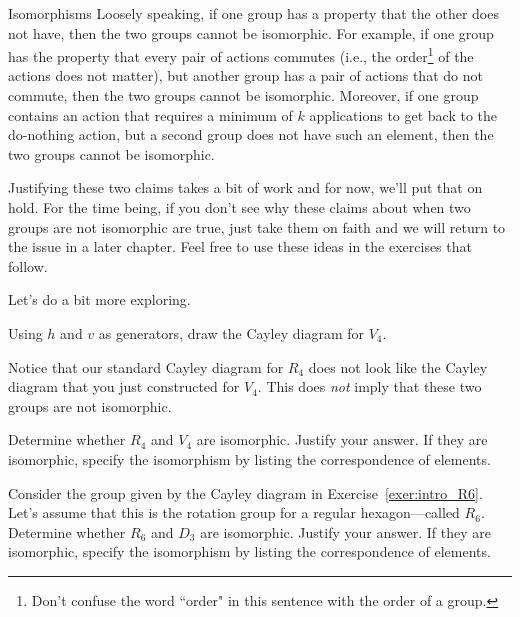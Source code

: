 \begin{section}{Isomorphisms}
Loosely speaking, if one group has a property that the other does not have, then the two groups cannot be isomorphic.  For example, if one group has the property that every pair of actions commutes (i.e., the order\footnote{Don't confuse the word ``order" in this sentence with the order of a group.} of the actions does not matter), but another group has a pair of actions that do not commute, then the two groups cannot be isomorphic.  Moreover, if one group contains an action that requires a minimum of $k$ applications to get back to the do-nothing action, but a second group does not have such an element, then the two groups cannot be isomorphic.  

Justifying these two claims takes a bit of work and for now, we'll put that on hold.  For the time being, if you don't see why these claims about when two groups are not isomorphic are true, just take them on faith and we will return to the issue in a later chapter.  Feel free to use these ideas in the exercises that follow.

Let's do a bit more exploring.

\begin{exercise}
Using $h$ and $v$ as generators, draw the Cayley diagram for $V_4$.
\end{exercise}

Notice that our standard Cayley diagram for $R_4$ does not look like the Cayley diagram that you just constructed for $V_4$.  This does \emph{not} imply that these two groups are not isomorphic.

\begin{problem}
Determine whether $R_4$ and $V_4$ are isomorphic.  Justify your answer.  If they are isomorphic, specify the isomorphism by listing the correspondence of elements.
\end{problem}

\begin{problem}
Consider the group given by the Cayley diagram in Exercise~\ref{exer:intro_R6}.  Let's assume that this is the rotation group for a regular hexagon---called $R_6$.  Determine whether $R_6$ and $D_3$ are isomorphic.  Justify your answer.  If they are isomorphic, specify the isomorphism by listing the correspondence of elements.
\end{problem}


\end{section}
